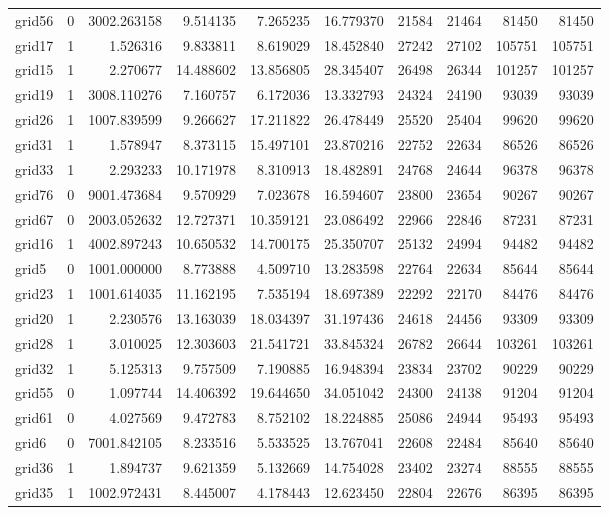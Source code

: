 \begin{longtable}{|l|r|r|r|r|r|r|r|r|r|}
grid56 & 0 & 3002.263158 & 9.514135 & 7.265235 & 16.779370 & 21584 & 21464 & 81450 & 81450 \\
grid17 & 1 & 1.526316 & 9.833811 & 8.619029 & 18.452840 & 27242 & 27102 & 105751 & 105751 \\
grid15 & 1 & 2.270677 & 14.488602 & 13.856805 & 28.345407 & 26498 & 26344 & 101257 & 101257 \\
grid19 & 1 & 3008.110276 & 7.160757 & 6.172036 & 13.332793 & 24324 & 24190 & 93039 & 93039 \\
grid26 & 1 & 1007.839599 & 9.266627 & 17.211822 & 26.478449 & 25520 & 25404 & 99620 & 99620 \\
grid31 & 1 & 1.578947 & 8.373115 & 15.497101 & 23.870216 & 22752 & 22634 & 86526 & 86526 \\
grid33 & 1 & 2.293233 & 10.171978 & 8.310913 & 18.482891 & 24768 & 24644 & 96378 & 96378 \\
grid76 & 0 & 9001.473684 & 9.570929 & 7.023678 & 16.594607 & 23800 & 23654 & 90267 & 90267 \\
grid67 & 0 & 2003.052632 & 12.727371 & 10.359121 & 23.086492 & 22966 & 22846 & 87231 & 87231 \\
grid16 & 1 & 4002.897243 & 10.650532 & 14.700175 & 25.350707 & 25132 & 24994 & 94482 & 94482 \\
grid5 & 0 & 1001.000000 & 8.773888 & 4.509710 & 13.283598 & 22764 & 22634 & 85644 & 85644 \\
grid23 & 1 & 1001.614035 & 11.162195 & 7.535194 & 18.697389 & 22292 & 22170 & 84476 & 84476 \\
grid20 & 1 & 2.230576 & 13.163039 & 18.034397 & 31.197436 & 24618 & 24456 & 93309 & 93309 \\
grid28 & 1 & 3.010025 & 12.303603 & 21.541721 & 33.845324 & 26782 & 26644 & 103261 & 103261 \\
grid32 & 1 & 5.125313 & 9.757509 & 7.190885 & 16.948394 & 23834 & 23702 & 90229 & 90229 \\
grid55 & 0 & 1.097744 & 14.406392 & 19.644650 & 34.051042 & 24300 & 24138 & 91204 & 91204 \\
grid61 & 0 & 4.027569 & 9.472783 & 8.752102 & 18.224885 & 25086 & 24944 & 95493 & 95493 \\
grid6 & 0 & 7001.842105 & 8.233516 & 5.533525 & 13.767041 & 22608 & 22484 & 85640 & 85640 \\
grid36 & 1 & 1.894737 & 9.621359 & 5.132669 & 14.754028 & 23402 & 23274 & 88555 & 88555 \\
grid35 & 1 & 1002.972431 & 8.445007 & 4.178443 & 12.623450 & 22804 & 22676 & 86395 & 86395 \\

\end{longtable}
